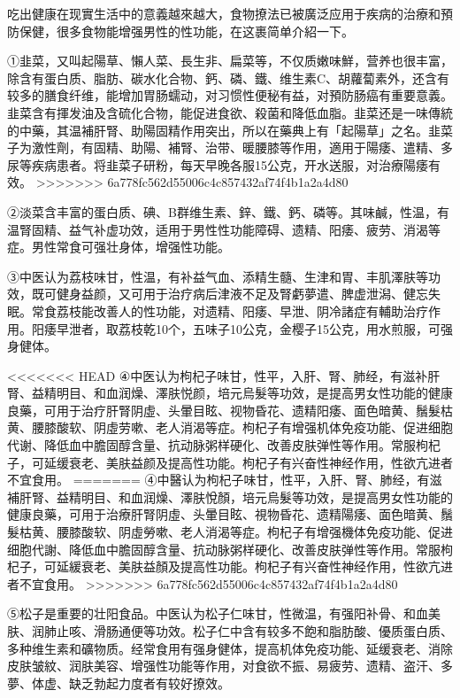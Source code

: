 \documentclass[12pt,UTF8]{ctexbook}
\begin{document}
吃出健康在现實生活中的意義越來越大，食物撩法已被廣泛应用于疾病的治療和預防保健，很多食物能增强男性的性功能，在这裹简单介紹一下。

①韭菜，又叫起陽草、懶人菜、長生非、扁菜等，不仅质嫩味鮮，营养也很丰富，除含有蛋白质、脂肪、碳水化合物、鈣、磷、鐵、维生素C、胡蘿蔔素外，还含有较多的膳食纤维，能增加胃肠蠕动，对习惯性便秘有益，对預防肠癌有重要意義。韭菜含有揮发油及含硫化合物，能促进食欲、殺菌和降低血脂。韭菜还是一味傳統的中藥，其温補肝腎、助陽固精作用突出，所以在藥典上有「起陽草」之名。韭菜子为激性劑，有固精、助陽、補腎、治带、暖腰膝等作用，適用于陽痿、遣精、多尿等疾病患者。将韭菜子研粉，每天早晚各服15公克，开水送服，对治療陽痿有效。
>>>>>>> 6a778fc562d55006c4c857432af74f4b1a2a4d80

②淡菜含丰富的蛋白质、碘、B群维生素、鋅、鐵、鈣、磷等。其味鹹，性温，有温腎固精、益气补虚功效，适用于男性性功能障碍、遗精、阳痿、疲劳、消渴等症。男性常食可强壮身体，增强性功能。

③中医认为荔枝味甘，性温，有补益气血、添精生髓、生津和胃、丰肌澤肤等功效，既可健身益颜，又可用于治疗病后津液不足及腎虧夢遣、脾虚泄潟、健忘失眠。常食荔枝能改善人的性功能，对遗精、阳痿、早泄、阴冷諸症有輔助治疗作用。阳痿早泄者，取荔枝乾10个，五味子10公克，金樱子15公克，用水煎服，可强身健体。

<<<<<<< HEAD
④中医认为枸杞子味甘，性平，入肝、腎、肺经，有滋补肝腎、益精明目、和血润燥、澤肤悦颜，培元烏髮等功效，是提高男女性功能的健康良藥，可用于治疗肝腎阴虛、头暈目眩、视物昏花、遗精阳痿、面色暗黄、鬚髮枯黄、腰膝酸软、阴虛劳嗽、老人消渴等症。枸杞子有增强机体免疫功能、促进细胞代谢、降低血中膽固醇含量、抗动脉粥样硬化、改善皮肤弹性等作用。常服枸杞子，可延缓衰老、美肤益颜及提高性功能。枸杞子有兴奋性神经作用，性欲亢进者不宜食用。
=======
④中醫认为枸杞子味甘，性平，入肝、腎、肺经，有滋補肝腎、益精明目、和血润燥、澤肤悅顏，培元烏髮等功效，是提高男女性功能的健康良藥，可用于治療肝腎阴虛、头暈目眩、視物昏花、遗精陽痿、面色暗黄、鬚髮枯黄、腰膝酸软、阴虛勞嗽、老人消渴等症。枸杞子有增强機体免疫功能、促进细胞代謝、降低血中膽固醇含量、抗动脉粥样硬化、改善皮肤弹性等作用。常服枸杞子，可延緩衰老、美肤益顏及提高性功能。枸杞子有兴奋性神经作用，性欲亢进者不宜食用。
>>>>>>> 6a778fc562d55006c4c857432af74f4b1a2a4d80

⑤松子是重要的壮阳食品。中医认为松子仁味甘，性微温，有强阳补骨、和血美肤、润肺止咳、滑肠通便等功效。松子仁中含有较多不飽和脂肪酸、優质蛋白质、多种维生素和礦物质。经常食用有强身健体，提高机体免疫功能、延缓衰老、消除皮肤皱紋、润肤美容、增强性功能等作用，对食欲不振、易疲劳、遗精、盗汗、多夢、体虚、缺乏勃起力度者有较好撩效。
\end{document}
